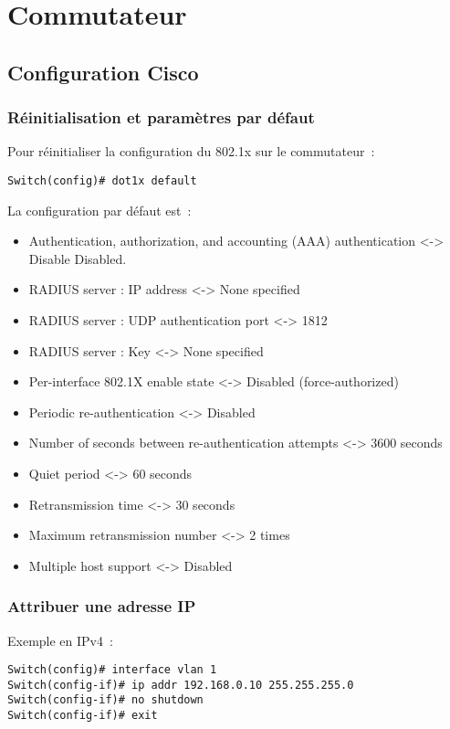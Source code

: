\section{Commutateur}
\subsection{Configuration Cisco}
\subsubsection{Réinitialisation et paramètres par défaut}

Pour réinitialiser la configuration du 802.1x sur le commutateur~:

\begin{lstlisting}
Switch(config)# dot1x default
\end{lstlisting}

La configuration par défaut est~:

\begin{itemize}
\item Authentication, authorization, and accounting (AAA) authentication <-> Disable Disabled. 
\item RADIUS server : IP address <-> None specified
\item RADIUS server : UDP authentication port <-> 1812
\item RADIUS server : Key <-> None specified
\item Per-interface 802.1X enable state <-> Disabled (force-authorized)
\item Periodic re-authentication <-> Disabled
\item Number of seconds between re-authentication attempts <-> 3600 seconds
\item Quiet period <-> 60 seconds
\item Retransmission time <-> 30 seconds
\item Maximum retransmission number <-> 2 times
\item Multiple host support <-> Disabled
\end{itemize}

\subsubsection{Attribuer une adresse IP}

Exemple en IPv4~:

\begin{lstlisting}
Switch(config)# interface vlan 1
Switch(config-if)# ip addr 192.168.0.10 255.255.255.0
Switch(config-if)# no shutdown
Switch(config-if)# exit
\end{lstlisting}

